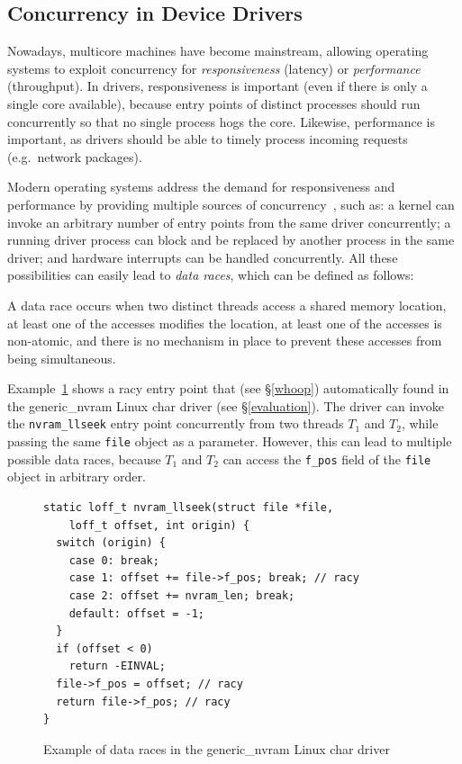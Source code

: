 \subsection{Concurrency in Device Drivers}
\label{bg:concurrency}

Nowadays, multicore machines have become mainstream, allowing operating systems to exploit concurrency for \emph{responsiveness} (latency) or \emph{performance} (throughput). In drivers, responsiveness is important (even if there is only a single core available), because entry points of distinct processes should run concurrently so that no single process hogs the core. Likewise, performance is important, as drivers should be able to timely process incoming requests (e.g.\ network packages).

Modern operating systems address the demand for responsiveness and performance by providing multiple sources of concurrency~\cite{corbet2005linux}, such as: a kernel can invoke an arbitrary number of entry points from the same driver concurrently; a running driver process can block and be replaced by another process in the same driver; and hardware interrupts can be handled concurrently. All these possibilities can easily lead to \emph{data races}, which can be defined as follows:

\begin{definition}
\label{definition:datarace}
A data race occurs when two distinct threads access a shared memory location, at least one of the accesses modifies the location, at least one of the accesses is non-atomic, and there is no mechanism in place to prevent these accesses from being simultaneous.
\end{definition}

Example~\ref{fig:data_race_example} shows a racy entry point that \whoop (see \S\ref{whoop}) automatically found in the generic\_nvram Linux char driver (see \S\ref{evaluation}). The driver can invoke the \texttt{nvram\_llseek} entry point concurrently from two threads $T_1$ and $T_2$, while passing the same \texttt{file} object as a parameter. However, this can lead to multiple possible data races, because $T_1$ and $T_2$ can access the \texttt{f\_pos} field of the \texttt{file} object in arbitrary order.

\begin{figure}[t]
\begin{lstlisting}
static loff_t nvram_llseek(struct file *file,
    loff_t offset, int origin) {
  switch (origin) {
    case 0: break;
    case 1: offset += file->f_pos; break; // racy
    case 2: offset += nvram_len; break;
    default: offset = -1;
  }
  if (offset < 0)
    return -EINVAL;
  file->f_pos = offset; // racy
  return file->f_pos; // racy
}
\end{lstlisting}
\caption{Example of data races in the generic\_nvram Linux char driver}
\label{fig:data_race_example}
\end{figure}

